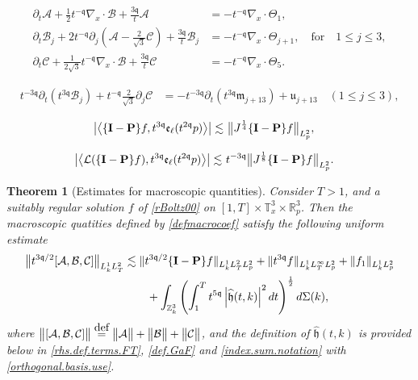\documentclass[10pt,a4paper]{amsart}
\newtheorem{theorem}{Theorem}
\newcommand{\eqdef }{\overset{\mbox{\tiny{def}}}{=}}
\newcommand{\highG}{\Theta}
\newcommand{\linL}{\mathcal{L}}
\newcommand{\micro}{{\bf \{I- P\}}}
\def\norm#1{\big\Vert#1\big\Vert}
\newcommand{\pv}{p}
\newcommand{\qq}{\mathfrak{q}}
\newcommand{\tTq}{t^{3\qq}}
\newcommand{\tmTq}{t^{-3\qq}}
\newcommand{\tmq}{t^{-\qq}}
\newcommand{\tqq}{t^{2\qq}}
\begin{document}
\begin{equation}\label{local.cons.alt}
\begin{split}
 \partial_t  \mathcal{A} 
     +
\frac{1}{2}  \tmq \nabla_x \cdot \mathcal{B}
+
\frac{3\qq }{t} {\mathcal{A}}
&=-\tmq \nabla_x \cdot \highG_{1},
\\ 
\partial_t \mathcal{B}_{j} 
 +
2\tmq\partial_j \left( \mathcal{A}
-\frac{2}{\sqrt{3}}
\mathcal{C}  \right)
+
\frac{3\qq }{t} {\mathcal{B}_{j}}
&=-\tmq \nabla_x \cdot \highG_{j+1}, \quad \text{for}\quad 1 \leq j \leq 3,
\\ 
\partial_t  \mathcal{C} 
  +
\frac{1}{2\sqrt{3}}  \tmq \nabla_x \cdot \mathcal{B} 
+
\frac{3\qq }{t} {\mathcal{C}}
&=-\tmq \nabla_x \cdot \highG_{5}.
\end{split}
\end{equation}

\begin{align}\label{macroscopic.B}
 \tmTq\partial_t \left(\tTq \mathcal{B}_{j} \right) 
 +
\tmq\frac{2}{\sqrt{3}}\partial_j \mathcal{C}  
&=
-\tmTq  \partial_t\left( \tTq \mathfrak{m}_{j+13} \right)+\mathfrak{u}_{j+13}\quad  (1 \leq j \leq 3),
\end{align}

\begin{align}\label{dispersion.term.basis.est}
   \left| \left\langle \micro  f, \tTq \mathfrak{e}_{\ell}(\tqq \pv)\right\rangle \right|
        \lesssim &~   \norm{J^{\frac{1}{4}} \micro   f}_{L^2_{\pv}},
\end{align}

    \begin{align}\label{lin.basis.est}
   \left| \left\langle \linL( \micro  f), \tTq \mathfrak{e}_{\ell}(\tqq \pv)\right\rangle \right|
        \lesssim &~ \tmTq \norm{J^{\frac{1}{8}} \micro  f}_{L^2_{\pv}}.
\end{align}

\begin{theorem}[Estimates for macroscopic quantities]\label{thmmacroscop}
Consider \(T>1\), and a suitably regular solution \(f\) of \eqref{rBoltz00} on \([1,T]\times \mathbb{T}^3_x\times \mathbb{R}^3_p\). Then the macroscopic quatities defined by \eqref{defmacrocoef} satisfy the following uniform estimate
\begin{align}\label{abcest.torus1}
\norm{t^{3\qq/2} [\mathcal{A},\mathcal{B},\mathcal{C}]}_{L^1_k L^2_T} &\lesssim
\Vert t^{3\qq/2}\micro f \Vert_{L^1_k L^2_T L^2_{\pv}} +\Vert \tTq f \Vert_{L^1_k L^\infty_T L^2_{\pv}} + \Vert f_1 \Vert_{L^1_k L^2_{\pv}} \\ \notag
&\qquad+ \int_{\mathbb{Z}^3_k} \left( \int^{T}_{1} t^{5\qq}\left| \widehat{\mathfrak{h}}(t,k)\right|^2
 dt \right)^{\frac12} d\Sigma (k),
\end{align}
where \(\norm{ [\mathcal{A},\mathcal{B},\mathcal{C}]}\eqdef\norm{ \mathcal{A}}+\norm{ \mathcal{B}}+\norm{ \mathcal{C}}\), and the definition of $ \widehat{\mathfrak{h}}(t,k)$ is provided below in \eqref{rhs.def.terms.FT}, \eqref{def.GaF}  and \eqref{index.sum.notation} with \eqref{orthogonal.basis.use}. 
\end{theorem}
\end{document}
